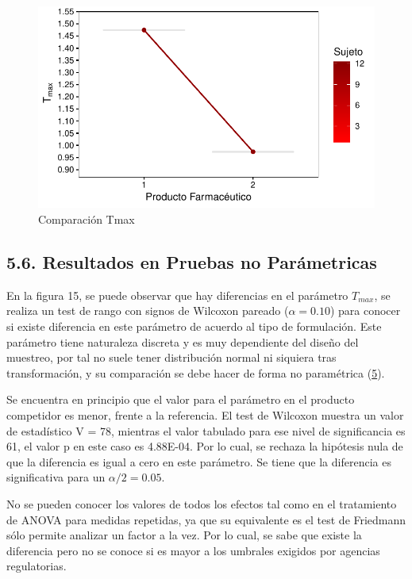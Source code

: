 \documentclass[]{article}
\begin{document}
\begin{figure}[H]

{\centering \includegraphics{parcial_1_files/figure-latex/unnamed-chunk-38-1} 

}

\caption{Comparación Tmax}\label{fig:unnamed-chunk-38}
\end{figure}

\subsection{5.6. Resultados en Pruebas no
Parámetricas}\label{resultados-en-pruebas-no-parametricas}

En la figura 15, se puede observar que hay diferencias en el parámetro
\(T_{max}\), se realiza un test de rango con signos de Wilcoxon pareado
(\(\alpha = 0.10\)) para conocer si existe diferencia en este parámetro
de acuerdo al tipo de formulación. Este parámetro tiene naturaleza
discreta y es muy dependiente del diseño del muestreo, por tal no suele
tener distribución normal ni siquiera tras transformación, y su
comparación se debe hacer de forma no paramétrica
(\protect\hyperlink{ref-Rani2004}{5}).

Se encuentra en principio que el valor para el parámetro en el producto
competidor es menor, frente a la referencia. El test de Wilcoxon muestra
un valor de estadístico V = 78, mientras el valor tabulado para ese
nivel de significancia es 61, el valor p en este caso es 4.88E-04. Por
lo cual, se rechaza la hipótesis nula de que la diferencia es igual a
cero en este parámetro. Se tiene que la diferencia es significativa para
un \(\alpha/2 = 0.05\).

No se pueden conocer los valores de todos los efectos tal como en el
tratamiento de ANOVA para medidas repetidas, ya que su equivalente es el
test de Friedmann sólo permite analizar un factor a la vez. Por lo cual,
se sabe que existe la diferencia pero no se conoce si es mayor a los
umbrales exigidos por agencias regulatorias.
\end{document}
